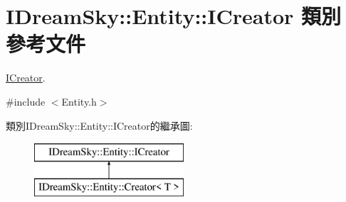 \hypertarget{class_i_dream_sky_1_1_entity_1_1_i_creator}{}\section{I\+Dream\+Sky\+:\+:Entity\+:\+:I\+Creator 類別 參考文件}
\label{class_i_dream_sky_1_1_entity_1_1_i_creator}


\hyperlink{class_i_dream_sky_1_1_entity_1_1_i_creator}{I\+Creator}.  




{\ttfamily \#include $<$Entity.\+h$>$}

類別\+I\+Dream\+Sky\+:\+:Entity\+:\+:I\+Creator的繼承圖\+:\begin{figure}[H]
\begin{center}
\leavevmode
\includegraphics[height=2.000000cm]{class_i_dream_sky_1_1_entity_1_1_i_creator}
\end{center}
\end{figure}
